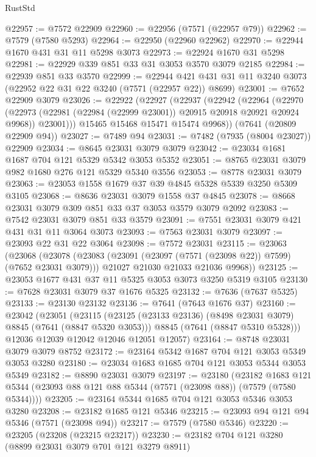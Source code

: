 \begin{lexlean}{RustStd}
\begin{coremodule}
@22957 := @7572 @22909
@22960 := @22956 (@7571 (@22957 @79))
@22962 := @7579 (@7580 @5293)
@22964 := @22950 (@22960 @22962)
@22970 := @22944 @1670 @431 @31 @11 @5298 @3073
@22973 := @22924 @1670 @31 @5298
@22981 := @22929 @339 @851 @33 @31 @3053 @3570 @3079 @2185
@22984 := @22939 @851 @33 @3570
@22999 := @22944 @421 @431 @31 @11 @3240 @3073 (@22952 @22 @31 @22 @3240 (@7571 (@22957 @22)) @8699)
@23001 := @7652 @22909 @3079
@23026 := @22922
    (@22927
      (@22937
        (@22942
          (@22964
            (@22970
              (@22973 (@22981 (@22984 (@22999 @23001)) @20915 @20918 @20921 @20924 @9968))
              @23001)))
        @15465
        @15468
        @15471
        @15474
        @9968))
    (@7641 (@20809 @22909 @94))
@23027 := @7489 @94
@23031 := @7482 (@7935 (@8004 @23027)) @22909
@23034 := @8645 @23031 @3079 @3079
@23042 := @23034 @1681 @1687 @704 @121 @5329 @5342 @3053 @5352
@23051 := @8765 @23031 @3079 @982 @1680 @276 @121 @5329 @5340 @3556
@23053 := @8778 @23031 @3079
@23063 := @23053 @1558 @1679 @37 @39 @4845 @5328 @5339 @3250 @5309 @3105
@23068 := @8636 @23031 @3079 @1558 @37 @4845
@23078 := @8668 @23031 @3079 @309 @851 @33 @37 @3053 @3579 @3079 @2092
@23083 := @7542 @23031 @3079 @851 @33 @3579
@23091 := @7551 @23031 @3079 @421 @431 @31 @11 @3064 @3073
@23093 := @7563 @23031 @3079
@23097 := @23093 @22 @31 @22 @3064
@23098 := @7572 @23031
@23115 := @23063
    (@23068
      (@23078
        (@23083 (@23091 (@23097 (@7571 (@23098 @22)) @7599) (@7652 @23031 @3079)))
        @21027
        @21030
        @21033
        @21036
        @9968))
@23125 := @23053 @1677 @431 @37 @11 @5325 @3053 @3073 @3250 @5319 @3105
@23130 := @7628 @23031 @3079 @37 @1676 @5325
@23132 := @7636 (@7637 @5325)
@23133 := @23130 @23132
@23136 := @7641 (@7643 @1676 @37)
@23160 := @23042
    (@23051
      (@23115
        (@23125 (@23133 @23136) (@8498 @23031 @3079) @8845 (@7641 (@8847 @5320 @3053)))
        @8845
        (@7641 (@8847 @5310 @5328)))
      @12036
      @12039
      @12042
      @12046
      @12051
      @12057)
@23164 := @8748 @23031 @3079 @3079 @8752
@23172 := @23164 @5342 @1687 @704 @121 @3053 @5349 @3053 @3280
@23180 := @23034 @1683 @1685 @704 @121 @3053 @5344 @3053 @5349
@23182 := @8890 @23031 @3079
@23197 := @23180
    (@23182 @1683 @121 @5344 (@23093 @88 @121 @88 @5344 (@7571 (@23098 @88)) (@7579 (@7580 @5344))))
@23205 := @23164 @5344 @1685 @704 @121 @3053 @5346 @3053 @3280
@23208 := @23182 @1685 @121 @5346
@23215 := @23093 @94 @121 @94 @5346 (@7571 (@23098 @94))
@23217 := @7579 (@7580 @5346)
@23220 := @23205 (@23208 (@23215 @23217))
@23230 := @23182 @704 @121 @3280 (@8899 @23031 @3079 @701 @121 @3279 @8911)

\end{coremodule}
\end{lexlean}
